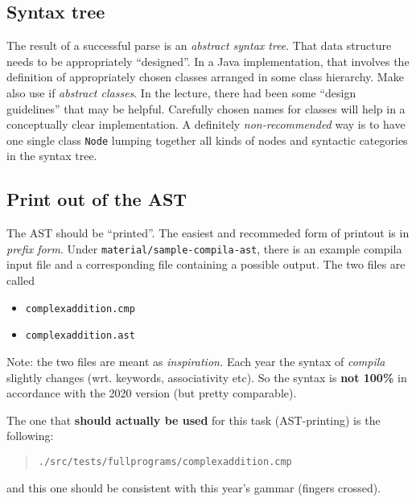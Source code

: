 \documentclass[10pt,freeform]{handout}[2014/08/13]
\begin{document}
\subsection{Syntax tree}
\label{sec:syntax-tree}

The result of a successful parse is an \emph{abstract syntax tree}. That
data structure needs to be appropriately ``designed''. In a Java
implementation, that involves the definition of appropriately chosen
classes arranged in some class hierarchy. Make also use if \emph{abstract
  classes}. In the lecture, there had been some ``design guidelines'' that
may be helpful. Carefully chosen names for classes will help in a
conceptually clear implementation. A definitely \emph{non-recommended} way
is to have one single class \texttt{Node} lumping together all kinds of
nodes and syntactic categories in the syntax tree.









\subsection{Print out of the AST}
\label{sec:print-out-ast}


The AST should be ``printed''. The easiest and recommeded form of printout
is in \emph{prefix form}. Under \texttt{material/sample-compila-ast}, there
is an example compila input file and a corresponding file containing a
possible output. The two files are called

\begin{itemize}
\item \texttt{complexaddition.cmp}
\item \texttt{complexaddition.ast}
\end{itemize}


Note: the two files are meant as \emph{inspiration.} Each year the syntax
of \textsl{compila} slightly changes (wrt. keywords, associativity etc). So
the syntax is \textbf{not 100\%} in accordance with the 2020 version (but
pretty comparable).

The one that \textbf{should actually be used} for this task (AST-printing)
is the following:

\begin{quote}
  \texttt{./src/tests/fullprograms/complexaddition.cmp}  
\end{quote}

and this one should be consistent with this year's gammar (fingers
crossed).
\end{document}
